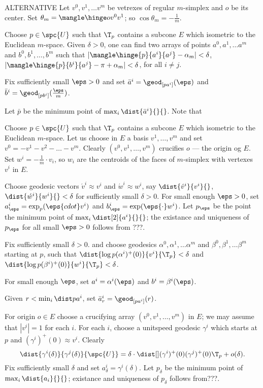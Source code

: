 ALTERNATIVE 
Let $v^0,v^1,\dots v^m$ be vetrexes of regular $m$-simplex and $o$ be its center.
Set $\theta_m=\mangle\hinge o{v^0}{v^1}$; so $\cos\theta_m=-\tfrac1m$.

Choose $p\in \spc{U}$ such that $\T_p$ contains a subcone $E$ which isometric to the Euclidean $m$-space.
Given $\delta>0$, one can find two arrays of points $a^0,a^1,\dots a^m$ and $b^0,b^1,\dots,b^m$
such that 
$|\mangle\hinge{p}{a^i}{a^j}-\alpha_m|<\delta$,
$|\mangle\hinge{p}{b^i}{a^j}-\pi+\alpha_m|<\delta$,
for all $i\not=j$.

Fix sufficiently small $\eps>0$ and set 
$\bar a^i=\geod_{[pa^i]}(\eps)$ 
and 
$\bar b^i=\geod_{[pb^i]}(\tfrac\eps m)$.

Let $\bar p$ be the minimum point of $\max_i\dist{\bar a^i}{}{}$.
Note that 

Choose $p\in \spc{U}$ such that $\T_p$ contains a subcone $E$ which isometric to the Euclidean $m$-space.
Let us choose in $E$ a basis $v^1,\dots,v^m$ and set $v^0=-v^1-v^2-\dots-v^m$.
Clearly $(v^0,v^1,\dots,v^m)$ crucifies $o$ --- the origin og $E$.
Set $w^i=-\tfrac1m{\cdot}v_i$, so $w_i$ are the centroids of the faces of $m$-simplex with vertexes $v^i$ in $E$.

Choose geodesic vectors $\acute{v}^i\approx v^i$ and $\acute{w}^i\approx w^i$, 
say $\dist{\acute{v}^i}{v^i}{}$, $\dist{\acute{w}^i}{w^i}{}<\delta$ for sufficiently small $\delta>0$.
For small enough $\eps>0$,
set $a^i_\eps=\exp_p(\eps{cdot}v^i)$ and $b^i_\eps=\exp(\eps{\cdot}w^i)$.
Let $p_\eps$ be the point the minimum point of $\max_i\dist[2]{a^i}{}{}$;
the existance and uniqueness of $p_\eps$ for all small $\eps>0$ follows from ???.




Fix sufficiently small $\delta>0$.
and choose geodesics  $\alpha^0,\alpha^1,\dots \alpha^m$ and $\beta^0,\beta^1,\dots \beta^m$ starting at $p$,
such that 
$\dist{\log{p}{(\alpha^i)^+(0)}}{v^i}{\T_p}<\delta$
and $\dist{\log{p}{(\beta^i)^+(0)}}{w^i}{\T_p}<\delta$.

For small enough $\eps$, set 
$a^i=\alpha^i(\eps)$ and $b^i=\beta^i(\eps)$.

Given $r<\min_i\dist p{a^i}{}$, set 
$\bar a^i_r=\geod_{[pa^i]}(r)$.


For origin $o\in E$ choose a crucifying array $(v^0,v^1,\dots,v^m)$ in $E$;
we may assume that $|v^i|=1$ for each $i$.
For each $i$,
choose a unitspeed geodesic $\gamma^i$ which starts at $p$ 
and $(\gamma^i)^+(0)\approx v^i$.
Clearly
$$
\dist{\gamma^i(\delta)}{\gamma^j(\delta)}{\spc{U}}
=
\delta\cdot\dist[{{}}]{(\gamma^i)^+(0)}{(\gamma^j)^+(0)}{\T_p}+o(\delta).
$$
Fix sufficiently small $\delta$ and set $a^i_\delta=\gamma^i(\delta)$.
Let $p_\delta$ be the minimum point of $\max_i\dist{a_i}{}{}$;
existance and uniqueness of $p_\delta$ follows from???.


